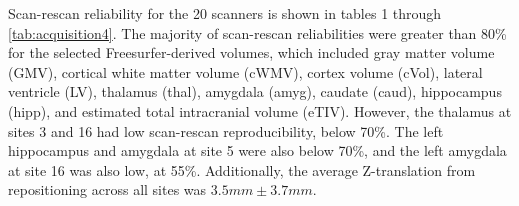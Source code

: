 Scan-rescan reliability for the 20 scanners is shown in tables 1 through \ref{tab:acquisition4}. The majority of scan-rescan reliabilities were greater than 80\% for the selected Freesurfer-derived volumes, which included gray matter volume (GMV), cortical white matter volume (cWMV), cortex volume (cVol), lateral ventricle (LV), thalamus (thal), amygdala (amyg), caudate (caud), hippocampus (hipp), and estimated total intracranial volume (eTIV). However, the thalamus at sites 3 and 16 had low scan-rescan reproducibility, below 70\%. The left hippocampus and amygdala at site 5 were also below 70\%, and the left amygdala at site 16 was also low, at 55\%. Additionally, the average Z-translation from repositioning across all sites was $3.5mm \pm 3.7mm$.

